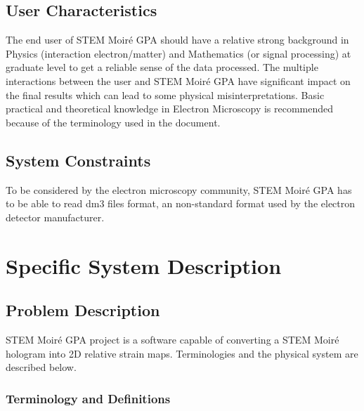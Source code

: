 \documentclass[12pt]{article}
\newcommand{\progname}{STEM Moir{\'e} GPA}
\begin{document}

\subsection{User Characteristics} \label{SecUserCharacteristics}

The end user of \progname{} should have a relative strong background in Physics 
(interaction electron/matter) and Mathematics (or signal processing) at graduate 
level to get a reliable sense of the data processed. The multiple interactions 
between the user and \progname{} have  significant impact on the final results 
which can lead to some physical misinterpretations. Basic practical and 
theoretical knowledge in Electron Microscopy is recommended because of the 
terminology used in the document. 

\subsection{System Constraints}

To be considered by the electron microscopy community, \progname{} has to be 
able to read dm3 files format, an non-standard format used by the electron 
detector manufacturer.
 

\section{Specific System Description}
\subsection{Problem Description} \label{Sec_pd}

STEM Moir{\'e} GPA project is a software capable of converting a STEM Moir{\'e} 
hologram into 2D relative strain maps. Terminologies and the physical system are 
described below.

\subsubsection{Terminology and Definitions}
\end{document}
